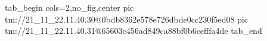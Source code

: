  
 
 
 
 

\qqSecOrig


\ifcmt
  tab_begin cols=2,no_fig,center
    pic tm://21_11_22.11.40.30@0bdb8362e578e726dbde0cc230f5ed08
    pic tm://21_11_22.11.40.31@65603c456ad849ca88bf0b6cefffa4de
  tab_end
\fi

